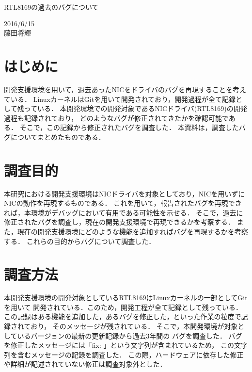 \documentclass[12pt]{jsarticle}
\begin{document}

\begin{center}
    {\LARGE RTL8169の過去のバグについて}
\end{center}

\begin{flushright}
    2016/6/15\\
    藤田将輝
\end{flushright}
\section{はじめに}
開発支援環境を用いて，過去あったNICをドライバのバグを再現することを考えている．
LinuxカーネルはGitを用いて開発されており，開発過程が全て記録として残っている．
本開発環境での開発対象であるNICドライバ(RTL8169)の開発過程も記録されており，
どのようなバグが修正されてきたかを確認可能である．
そこで，この記録から修正されたバグを調査した．
本資料は，調査したバグについてまとめたものである．

\section{調査目的}
本研究における開発支援環境はNICドライバを対象としており，NICを用いずにNICの動作を再現するものである．
これを用いて，報告されたバグを再現できれば，本環境がデバッグにおいて有用である可能性を示せる．
そこで，過去に修正されたバグを調査し，現在の開発支援環境で再現できるかを考察する．
また，現在の開発支援環境にどのような機能を追加すればバグを再現するかを考察する．
これらの目的からバグについて調査した．

\section{調査方法}
本開発支援環境の開発対象としているRTL8169はLinuxカーネルの一部としてGitを用いて
開発されている．このため，開発工程が全て記録として残っている．
この記録はある機能を追加した，あるバグを修正した，といった作業の粒度で記録されており，
そのメッセージが残されている．
そこで，本開発環境が対象としているバージョンの最新の更新記録から過去3年間の
バグを調査した．
バグを修正したメッセージには「fix: 」という文字列が含まれているため，
この文字列を含むメッセージの記録を調査した．
この際，ハードウェアに依存した修正や詳細が記述されていない修正は調査対象外とした．
\end{document}
